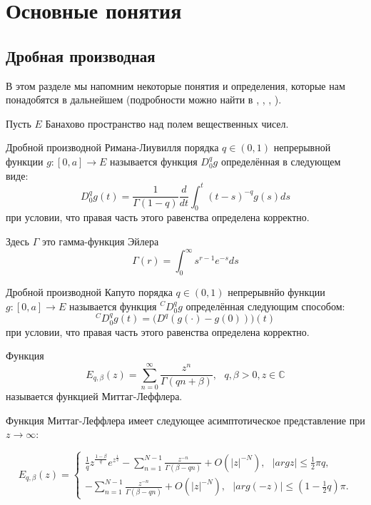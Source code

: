 \section{Основные понятия}

\subsection{Дробная производная}

В этом разделе мы напомним некоторые понятия и определения, которые нам понадобятся в дальнейшем
(подробности можно найти в \cite{gorenflo}, \cite{kilbas}, \cite{podlubny}, \cite{zhou}).

Пусть $E$ Банахово пространство над полем вещественных чисел.

\begin{definition}
    Дробной производной Римана-Лиувилля порядка $q \in (0, 1)$ непрерывной функции $g:[0, a] \rightarrow E$ называется
    функция $D_{0}^{q}g$ определённая в следующем виде:
    $$D_{0}^{q}g(t) = \frac{1}{\Gamma(1 - q)}\frac{d}{dt}\int_{0}^{t}(t - s)^{-q}g(s)ds$$
    при условии, что правая часть этого равенства определена корректно.
\end{definition}

Здесь $\Gamma$ это гамма-функция Эйлера $$\Gamma(r) = \int_{0}^{\infty}s^{r-1}e^{-s}ds$$

\begin{definition}
    Дробной производной Капуто порядка $q \in (0, 1)$ непрерывнйо функции $g:[0, a] \rightarrow E$ называется функция
    ${}^CD_{0}^{q}g$ определённая следующим способом:
    $${}^CD_{0}^{q}g(t) = \Big(D^q(g(\cdot) - g(0))\Big)(t)$$
    при условии, что правая часть этого равенства определена корректно.
\end{definition}

\begin{definition}
    Функция
    $$E_{q,\beta}(z) = \sum_{n=0}^{\infty}\frac{z^n}{\Gamma(qn + \beta)}, \ \ \ q, \beta > 0, z \in \mathbb{C}$$
    называется функцией Миттаг-Леффлера.
\end{definition}

Функция Миттаг-Леффлера имеет следующее асимптотическое представление при $z \rightarrow \infty$:

\begin{equation}
    E_{q,\beta}(z) = 
    \begin{cases}
        \frac{1}{q}z^{\frac{1-\beta}{q}}e^{z^{\frac{1}{q}}} - \sum_{n=1}^{N-1}\frac{z^{-n}}{\Gamma(\beta-qn)} +
        O(|z|^{-N}), \ \ \ |argz| \leq \frac{1}{2} \pi q,\\
        - \sum_{n=1}^{N-1} \frac{z^{-n}}{\Gamma(\beta-qn)} + O(|z|^{-N}), \ \ \ |arg(-z)| \leq (1 - \frac{1}{2}q)\pi.
    \end{cases}
\end{equation}

